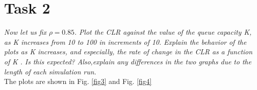 \documentclass[10pt]{article}
\begin{document}
\section*{Task 2}
\textit{Now let us fix $\rho = 0.85$. Plot the CLR against the value of the queue capacity K, as K increases from 10 to 100 in increments of 10. Explain the behavior of the plots as K increases, and especially, the rate of change in the CLR as a function of K . Is this expected? Also,explain any differences in the two graphs due to the length of each simulation run.} \\

The plots are shown in Fig. \ref{fig3} and Fig. \ref{fig4}
\end{document}
